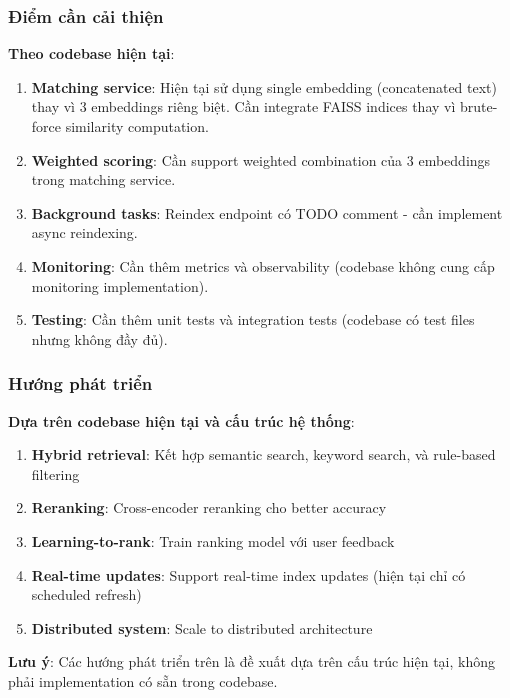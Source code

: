 \subsubsection{Điểm cần cải thiện}

\textbf{Theo codebase hiện tại}:

\begin{enumerate}
    \item \textbf{Matching service}: Hiện tại sử dụng single embedding (concatenated text) thay vì 3 embeddings riêng biệt. Cần integrate FAISS indices thay vì brute-force similarity computation.
    \item \textbf{Weighted scoring}: Cần support weighted combination của 3 embeddings trong matching service.
    \item \textbf{Background tasks}: Reindex endpoint có TODO comment - cần implement async reindexing.
    \item \textbf{Monitoring}: Cần thêm metrics và observability (codebase không cung cấp monitoring implementation).
    \item \textbf{Testing}: Cần thêm unit tests và integration tests (codebase có test files nhưng không đầy đủ).
\end{enumerate}

\subsubsection{Hướng phát triển}

\textbf{Dựa trên codebase hiện tại và cấu trúc hệ thống}:

\begin{enumerate}
    \item \textbf{Hybrid retrieval}: Kết hợp semantic search, keyword search, và rule-based filtering
    \item \textbf{Reranking}: Cross-encoder reranking cho better accuracy
    \item \textbf{Learning-to-rank}: Train ranking model với user feedback
    \item \textbf{Real-time updates}: Support real-time index updates (hiện tại chỉ có scheduled refresh)
    \item \textbf{Distributed system}: Scale to distributed architecture
\end{enumerate}

\textbf{Lưu ý}: Các hướng phát triển trên là đề xuất dựa trên cấu trúc hiện tại, không phải implementation có sẵn trong codebase.



